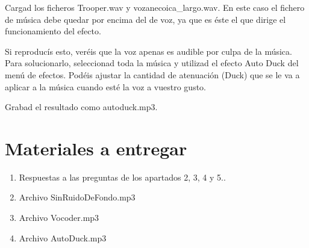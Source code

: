 \documentclass[es,practica]{uah}
\begin{document}
Cargad los ficheros Trooper.wav y vozanecoica\_largo.wav. En este caso el fichero de música debe quedar por encima del de voz, ya que es éste el que dirige el funcionamiento del efecto.
 
Si reproducís esto, veréis que la voz apenas es audible por culpa de la música. Para solucionarlo, seleccionad toda la música y utilizad el efecto Auto Duck del menú de efectos. Podéis ajustar la cantidad de atenuación (Duck) que se le va a aplicar a la música cuando esté la voz a vuestro gusto. 

Grabad el resultado como autoduck.mp3.

\section{Materiales a entregar}

\begin{enumerate}
	\item Respuestas a las preguntas de los apartados 2, 3, 4 y 5..
	\item Archivo SinRuidoDeFondo.mp3
	\item Archivo Vocoder.mp3
	\item Archivo AutoDuck.mp3
\end{enumerate}
\end{document}
